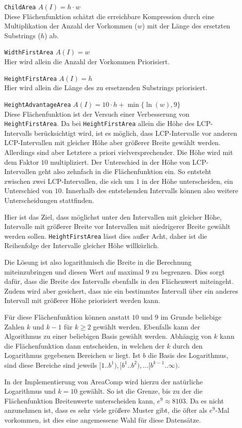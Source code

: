 \begin{itemize}[leftmargin=3.6cm]
    \item[\texttt{ChildArea}] $A(I) = h \cdot w$\\
    Diese Flächenfunktion schätzt die erreichbare Kompression durch eine Multiplikation der Anzahl der Vorkommen ($w$) mit der Länge des ersetzten Substrings ($h$) ab.
    \item[\texttt{WidthFirstArea}] $A(I) = w$\\ Hier wird allein die Anzahl der Vorkommen Priorisiert.
    \item[\texttt{HeightFirstArea}] $A(I) = h$\\
    Hier wird allein die Länge des zu ersetzenden Substrings priorisiert.
    \item[\texttt{HeightAdvantageArea}] $A(I) = 10 \cdot h + \min\{\ln(w), 9\}$\\ 
    Diese Flächenfunktion ist der Versuch einer Verbesserung von \\
    \texttt{HeightFirstArea}. Da bei \texttt{HeightFirstArea} allein die Höhe des LCP-Intervalls berücksichtigt wird, ist es möglich, dass LCP-Intervalle vor anderen LCP-Intervallen mit gleicher Höhe aber größerer Breite gewählt werden. Allerdings sind aber Letztere a priori vielversprechender. Die Höhe wird mit dem Faktor $10$ multipliziert. Der Unterschied in der Höhe von LCP-Intervallen geht also zehnfach in die Flächenfunktion ein. So entsteht zwischen zwei LCP-Intervallen, die sich um $1$ in der Höhe unterscheiden, ein Unterschied von $10$. Innerhalb des entstehenden Intervalls können also weitere Unterscheidungen stattfinden. 

    Hier ist das Ziel, dass möglichst unter den Intervallen mit gleicher Höhe, Intervalle mit größerer Breite vor Intervallen mit niedrigerer Breite gewählt werden sollen. \texttt{HeightFirstArea} lässt dies außer Acht, daher ist die Reihenfolge der Intervalle gleicher Höhe willkürlich.

    Die Lösung ist also  logarithmisch die Breite in die Berechnung miteinzubringen und diesen Wert auf maximal $9$ zu begrenzen. Dies sorgt dafür, dass die Breite des Intervalls ebenfalls in den Flächenwert miteingeht. Zudem wird aber gesichert, dass nie ein bestimmtes Intervall über ein anderes Intervall mit größerer Höhe priorisiert werden kann. 
    
    Für diese Flächenfunktion können anstatt $10$ und $9$ im Grunde beliebige Zahlen $k$ und $k - 1$ für $k \geq 2$ gewählt werden. Ebenfalls kann der Algorithmus zu einer beliebigen Basis gewählt werden.
    Abhängig von $k$ kann die Flächenfunktion dann entscheiden, in welchen der $k$ durch den Logarithmus gegebenen Bereichen $w$ liegt. Ist $b$ die Basis des Logarithmus, sind diese Bereiche sind jeweils $[1..b^1), [b^1..b^2), \dots [b^{k-1}..\infty)$. 

    In der Implementierung von AreaComp wird hierzu der natürliche Logarithmus und $k = 10$ gewählt.
    So ist die Grenze, bis zu der die Flächenfunktion Breitenwerte unterscheiden kann, $e^9 \approx 8103$. Da es nicht anzunehmen ist, dass es sehr viele größere Muster gibt, die öfter als $e^9$-Mal vorkommen, ist dies eine angemessene Wahl für diese Datensätze.
\end{itemize}

